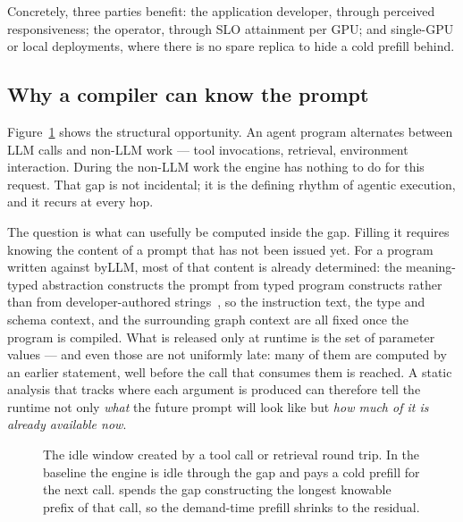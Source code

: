 Concretely, three parties benefit: the application developer, through perceived
responsiveness; the operator, through SLO attainment per GPU; and single-GPU or
local deployments, where there is no spare replica to hide a cold prefill behind.

\subsection{Why a compiler can know the prompt}

Figure~\ref{fig:motivation} shows the structural opportunity. An agent program
alternates between LLM calls and non-LLM work --- tool invocations, retrieval,
environment interaction. During the non-LLM work the engine has nothing to do for
this request. That gap is not incidental; it is the defining rhythm of agentic
execution, and it recurs at every hop.

The question is what can usefully be computed inside the gap. Filling it requires
knowing the content of a prompt that has not been issued yet. For a program
written against byLLM, most of that content is already determined: the meaning-typed
abstraction constructs the prompt from typed program constructs rather than from
developer-authored strings~\cite{dantanarayana2025mtp}, so the instruction text,
the type and schema context, and the surrounding graph context are all fixed once
the program is compiled. What is released only at runtime is the set of parameter
values --- and even those are not uniformly late: many of them are computed by an
earlier statement, well before the call that consumes them is reached. A static
analysis that tracks where each argument is produced can therefore tell the
runtime not only \emph{what} the future prompt will look like but \emph{how much
of it is already available now}.

\begin{figure}[t]
\centering

\caption{The idle window created by a tool call or retrieval round trip. In the
baseline the engine is idle through the gap and pays a cold prefill for the next
call. \sysname{} spends the gap constructing the longest knowable prefix of that
call, so the demand-time prefill shrinks to the residual.}
\label{fig:motivation}
\end{figure}

